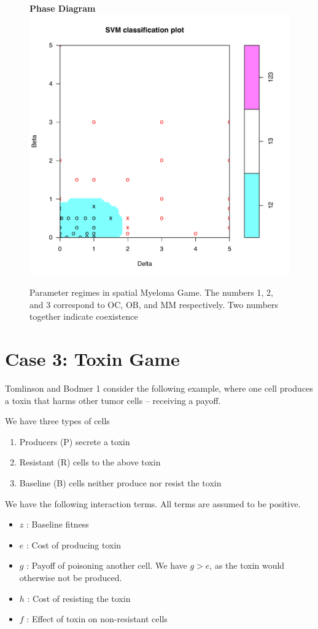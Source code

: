 \documentclass[12pt]{report}
\begin{document}
\begin{figure}[!h]
\centering
\textbf{Phase Diagram}
\includegraphics[width = 0.8 \linewidth]{Diagrams/dingli_phase-cropped}
\caption{Parameter regimes in spatial Myeloma Game. The numbers 1, 2, and 3 correspond to OC, OB, and MM respectively. Two numbers together indicate coexistence}
\end{figure}

\section*{Case 3: Toxin Game}
Tomlinson and Bodmer \cite{TomBod}1 consider the following example, where one cell produces a toxin that harms other tumor cells -- receiving a payoff. 

We have three types of cells
\begin{enumerate}
\item Producers (P) secrete a toxin
\item Resistant (R) cells to the above toxin
\item Baseline (B) cells neither produce nor resist the toxin
\end{enumerate}

We have the following interaction terms. All terms are assumed to be positive.
\begin{itemize}
\item $z$ : Baseline fitness
\item $e$ : Cost of producing toxin
\item $g$ :  Payoff of poisoning another cell. We have $g > e$, as the toxin would otherwise not be produced.
\item $h$ :  Cost of resisting the toxin
\item $f$ : Effect of toxin on non-resistant cells
\end{itemize}
\end{document}
